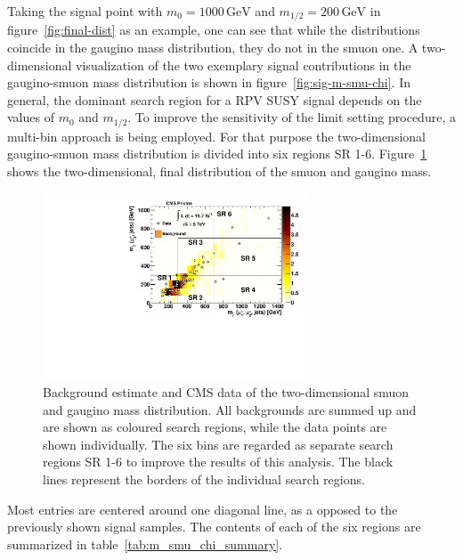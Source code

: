 Taking the signal point with $m_0 = 1000\,\text{GeV}$ and $m_{1/2} = 200\,\text{GeV}$ in figure~\ref{fig:final-dist} as an example, one can see that while the distributions coincide in the gaugino mass distribution, they do not in the smuon one. A two-dimensional visualization of the two exemplary signal contributions in the gaugino-smuon mass distribution is shown in figure~\ref{fig:sig-m-smu-chi}. In general, the dominant search region for a RPV SUSY signal depends on the values of $m_0$ and $m_{1/2}$. To improve the sensitivity of the limit setting procedure, a multi-bin approach is being employed. For that purpose the two-dimensional gaugino-smuon mass distribution is divided into six regions SR 1-6. Figure~\ref{fig:m_smu_chi} shows the two-dimensional, final distribution of the smuon and gaugino mass.

\begin{figure}[!htb]
  \centering
  \includegraphics[width=0.7\textwidth]{plots/m_smu_chi.pdf}
  \caption{Background estimate and CMS data of the two-dimensional smuon and gaugino mass distribution. All backgrounds are summed up and are shown as coloured search regions, while the data points are shown individually. The six bins are regarded as separate search regions SR 1-6 to improve the results of this analysis. The black lines represent the borders of the individual search regions.}
  \label{fig:m_smu_chi}
\end{figure}

\noindent Most entries are centered around one diagonal line, as a opposed to the previously shown signal samples. The contents of each of the six regions are summarized in table~\ref{tab:m_smu_chi_summary}.

